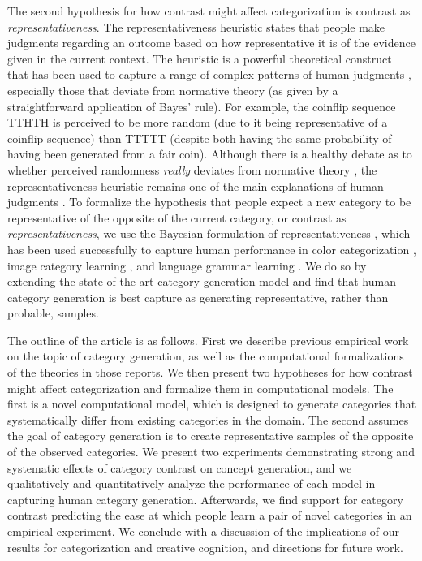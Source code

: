 \documentclass[12pt]{article}
\begin{document}
\begin{flushleft}
The second hypothesis for how contrast might affect categorization is contrast as {\em representativeness}. The representativeness heuristic \citep{kahneman73} states that people make judgments regarding an outcome based on how representative it is of the evidence given in the current context. The heuristic is a powerful theoretical construct that has been used to capture a range of complex patterns of human judgments \citep{kahneman73,tversky74,tversky83}, especially those that deviate from normative theory (as given by a straightforward application of Bayes' rule). For example, the coinflip sequence TTHTH is perceived to be more random (due to it being representative of a coinflip sequence) than TTTTT (despite both having the same probability of having been generated from a fair coin). Although there is a healthy debate as to whether perceived randomness {\em really} deviates from normative theory \citep{griffiths18,hahn09}, the representativeness heuristic remains one of the main explanations of human judgments \citep{reimers18}. To formalize the hypothesis that people expect a new category to be representative of the opposite of the current category, or contrast as {\em representativeness}, we use the Bayesian formulation of representativeness \citep{tenenbaum01}, which has been used successfully to capture human performance in color categorization \citep{abbott16}, image category learning \citep{abbott11}, and language grammar learning \citep{rafferty10}. We do so by extending the state-of-the-art category generation model \citep{jern2013probabilistic} and find that  human category generation is best capture as generating representative, rather than probable, samples.

The outline of the article is as follows. First we describe previous empirical work on the topic of category generation, as well as the computational formalizations of the theories in those reports. We then present two hypotheses for how contrast might affect categorization and formalize them in computational models. The first is a novel computational model, which is designed to generate categories that systematically differ from existing categories in the domain. The second assumes the goal of category generation is to create representative samples of the opposite of the observed categories. We present two experiments demonstrating strong and systematic effects of category contrast on concept generation, and we qualitatively and quantitatively analyze the performance of each model in capturing human category generation. Afterwards, we find support for category contrast predicting the ease at which people learn a pair of novel categories in an empirical experiment. We conclude with a discussion of the implications of our results for categorization and creative cognition, and directions for future work.


\end{flushleft}
\end{document}
